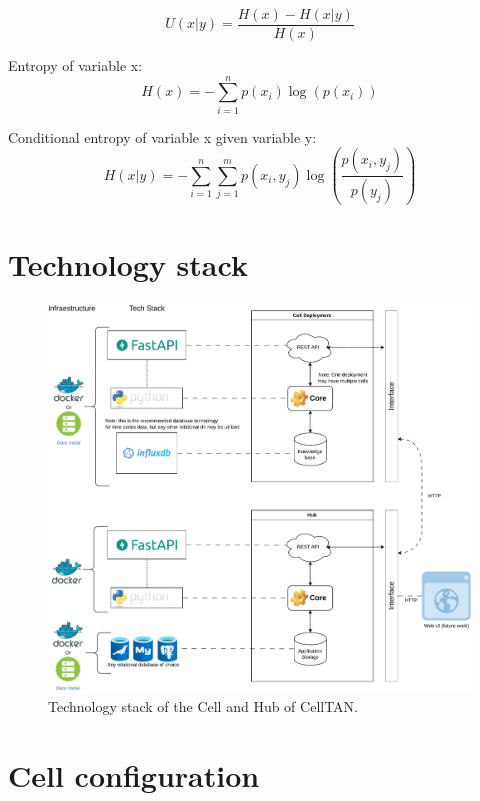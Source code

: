 \begin{equation}
U(x|y) = \frac{H(x) - H(x|y)}{H(x)}
\end{equation}

Entropy of variable x:
\begin{equation}
H(x) = -\sum_{i=1}^{n} p(x_i) \log(p(x_i))
\end{equation}

Conditional entropy of variable x given variable y:
\begin{equation}
H(x|y) = -\sum_{i=1}^{n} \sum_{j=1}^{m} p(x_i, y_j) \log\left(\frac{p(x_i, y_j)}{p(y_j)}\right)
\end{equation}


\section{Technology stack} \label{ap1:techstack}

\begin{figure}[h!]
    \centering
    \includegraphics[width=\linewidth]{figures/appendix/techstack.pdf}
    \caption{Technology stack of the Cell and Hub of CellTAN.}
    \label{fig:techstack}
\end{figure}


\section{Cell configuration} \label{ap1:config}
 
